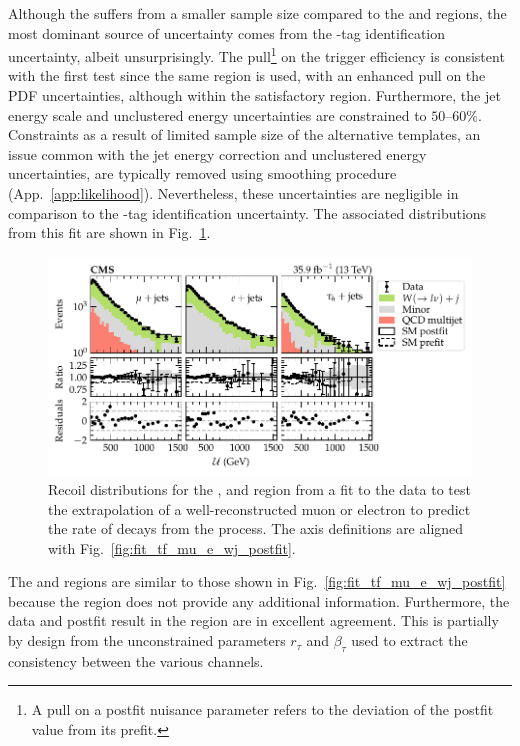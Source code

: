 %
Although the \tauplusjets suffers from a smaller sample size compared to the \muplusjets and \eleplusjets regions, the most dominant source of uncertainty comes from the \Ptauh-tag identification uncertainty, albeit unsurprisingly.  The pull\footnote{A pull on a postfit nuisance parameter refers to the deviation of the postfit value from its prefit.} on the \ptmiss trigger efficiency is consistent with the first test since the same region is used, with an enhanced pull on the PDF uncertainties, although within the satisfactory region. Furthermore, the jet energy scale and unclustered energy uncertainties are constrained to $50$--$60\%$. Constraints as a result of limited sample size of the alternative templates, an issue common with the jet energy correction and unclustered energy uncertainties, are typically removed using smoothing procedure (App.~\ref{app:likelihood}). Nevertheless, these uncertainties are negligible in comparison to the \Ptauh-tag identification uncertainty. The associated \recoil distributions from this fit are shown in Fig.~\ref{fig:fit_tf_mue_t_wj_postfit}.
%
\begin{figure}[htb]
    \centering
    \includegraphics{chapters/042_backgrounds/images/postfit_tfmue2twj.pdf}
    \caption[Recoil distributions corrected by the transfer factor from the muon and electron control regions to the $\tau$-lepton validation region.]{
        Recoil distributions for the \muplusjets, \eleplusjets and \tauplusjets region from a fit to the data to test the extrapolation of a well-reconstructed muon or electron to predict the rate of \Ptauh decays from the \IWj process. The axis definitions are aligned with Fig.~\ref{fig:fit_tf_mu_e_wj_postfit}.
    }
    \label{fig:fit_tf_mue_t_wj_postfit}
\end{figure}
%
The \muplusjets and \eleplusjets regions are similar to those shown in Fig.~\ref{fig:fit_tf_mu_e_wj_postfit} because the \tauplusjets region does not provide any additional information. Furthermore, the data and postfit result in the \tauplusjets region are in excellent agreement. This is partially by design from the unconstrained parameters $r_\tau$ and $\beta_\tau$ used to extract the consistency between the various channels.

